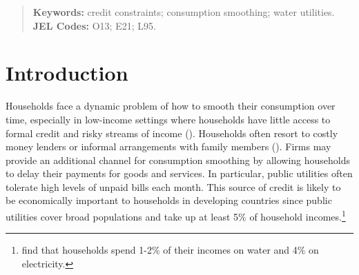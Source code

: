 \documentclass[12pt]{article}
\begin{document}
\begin{titlepage}
\begin{abstract}





	

 
\vspace{.5in}
\textbf{Keywords:} credit constraints; consumption smoothing; water utilities.\\
\textbf{JEL Codes:} O13; E21; L95.\\
\bigskip
\end{abstract}
\setcounter{page}{0}
\thispagestyle{empty}
\end{titlepage}
\pagebreak \newpage

\onehalfspacing

\section{Introduction}



Households face a dynamic problem of how to smooth their consumption over time, especially in low-income settings where households have little access to formal credit and risky streams of income (\cite{morduch1995income}).  Households often resort to costly money lenders or informal arrangements with family members (\cite{banerjee2007economic}).  Firms may provide an additional channel for consumption smoothing by allowing households to delay their payments for goods and services.  In particular, public utilities often tolerate high levels of unpaid bills each month.  This source of credit is likely to be economically important to households in developing countries since public utilities cover broad populations and take up at least 5\% of household incomes.\footnote{\cite{komives2006distributional} find that households spend 1-2\% of their incomes on water and 4\% on electricity.} 
\end{document}
